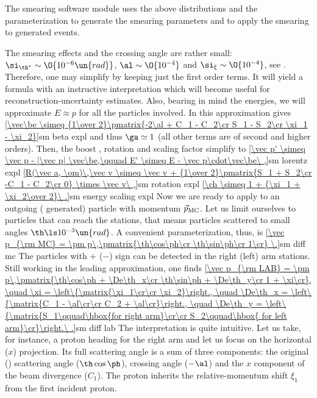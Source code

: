 The smearing software module uses the above distributions and the parameterization  to generate the smearing parameters and  to apply the smearing to  generated events.

The smearing effects and the crossing angle are rather small: $\si_{\th^*} \sim \O{10^{-6}\un{rad}}$, $\al \sim \O{10^{-4}}$ and $\si_\xi \sim \O{10^{-4}}$, see . Therefore, one may simplify  by keeping just the first order terms. It will yield a formula with an instructive interpretation which will become useful for reconstruction-uncertainty estimates. Also, bearing in mind the  energies, we will approximate $E\approx p$ for all the particles involved. In this approximation  gives
\eqref{\vec\be \simeq {1\over 2}\pmatrix{-2\al + C_1 - C_2\cr S_1 - S_2\cr \xi_1 - \xi_2}}{sm beta expl}
and thus $\ga\simeq 1$ (all other terms are of second and higher orders). Then, the boost , rotation  and scaling factor  simplify to
\eqref{\vec p' \simeq \vec p - |\vec p| \vec\be,\qquad E' \simeq E - \vec p\cdot\vec\be\ ,}{sm lorentz expl}
\eqref{R(\vec a, \om)\,\vec v \simeq \vec v + {1\over 2}\pmatrix{S_1 + S_2\cr -C_1 - C_2\cr 0} \times \vec v\ ,}{sm rotation expl}
\eqref{\ch \simeq 1 + {\xi_1 + \xi_2\over 2}\ .}{sm energy scaling expl}
Now we are ready to apply  to an outgoing ( generated) particle with momentum $\vec p_{\rm MC}$. Let us limit ourselves to particles that can reach the  stations, that means particles scattered to small angles $\th \ls 10^{-3}\un{rad}$. A convenient parameterization, thus, is
\eqref{\vec p_{\rm MC} = \pm p\,\pmatrix{\th\cos\ph\cr \th\sin\ph\cr 1\cr} \.}{sm diff mc}
The particles with $+$ ($-$) sign can be detected in the right (left) arm  stations. Still working in the leading approximation, one finds
\eqref{\vec p_{\rm LAB} = \pm p\,\pmatrix{\th\cos\ph + \De\th_x\cr \th\sin\ph + \De\th_y\cr 1 + \xi\cr},
\quad \xi = \left\{\matrix{\xi_1\cr\cr \xi_2}\right.,
\quad \De\th_x = \left\{\matrix{C_1 - \al\cr\cr C_2 + \al\cr}\right.,
\quad \De\th_y = \left\{\matrix{S_1\qquad\hbox{for right arm}\cr\cr S_2\qquad\hbox{ for left arm}\cr}\right.\ .}{sm diff lab} %
The interpretation is quite intuitive. Let us take, for instance, a proton heading for the right arm and let us focus on the horizontal ($x$) projection. Its full scattering angle is a sum of three components: the original () scattering angle ($\th\cos\ph$), crossing angle ($-\al$) and the $x$ component of the beam divergence ($C_1$). The proton inherits the relative-momentum shift $\xi_1$ from the first incident proton.


